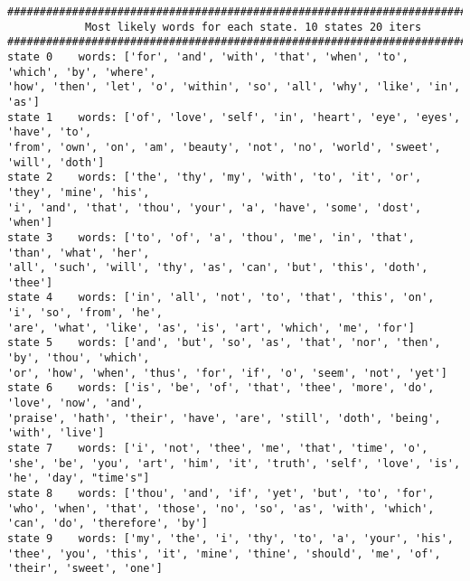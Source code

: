 \begin{lstlisting}[mathescape]
######################################################################################################
            Most likely words for each state. 10 states 20 iters
######################################################################################################
state 0    words: ['for', 'and', 'with', 'that', 'when', 'to', 'which', 'by', 'where',
'how', 'then', 'let', 'o', 'within', 'so', 'all', 'why', 'like', 'in', 'as']
state 1    words: ['of', 'love', 'self', 'in', 'heart', 'eye', 'eyes', 'have', 'to',
'from', 'own', 'on', 'am', 'beauty', 'not', 'no', 'world', 'sweet', 'will', 'doth']
state 2    words: ['the', 'thy', 'my', 'with', 'to', 'it', 'or', 'they', 'mine', 'his',
'i', 'and', 'that', 'thou', 'your', 'a', 'have', 'some', 'dost', 'when']
state 3    words: ['to', 'of', 'a', 'thou', 'me', 'in', 'that', 'than', 'what', 'her', 
'all', 'such', 'will', 'thy', 'as', 'can', 'but', 'this', 'doth', 'thee']
state 4    words: ['in', 'all', 'not', 'to', 'that', 'this', 'on', 'i', 'so', 'from', 'he', 
'are', 'what', 'like', 'as', 'is', 'art', 'which', 'me', 'for']
state 5    words: ['and', 'but', 'so', 'as', 'that', 'nor', 'then', 'by', 'thou', 'which', 
'or', 'how', 'when', 'thus', 'for', 'if', 'o', 'seem', 'not', 'yet']
state 6    words: ['is', 'be', 'of', 'that', 'thee', 'more', 'do', 'love', 'now', 'and', 
'praise', 'hath', 'their', 'have', 'are', 'still', 'doth', 'being', 'with', 'live']
state 7    words: ['i', 'not', 'thee', 'me', 'that', 'time', 'o', 'she', 'be', 'you', 'art', 'him', 'it', 'truth', 'self', 'love', 'is', 'he', 'day', "time's"]
state 8    words: ['thou', 'and', 'if', 'yet', 'but', 'to', 'for', 'who', 'when', 'that', 'those', 'no', 'so', 'as', 'with', 'which', 'can', 'do', 'therefore', 'by']
state 9    words: ['my', 'the', 'i', 'thy', 'to', 'a', 'your', 'his', 'thee', 'you', 'this', 'it', 'mine', 'thine', 'should', 'me', 'of', 'their', 'sweet', 'one']
\end{lstlisting}

